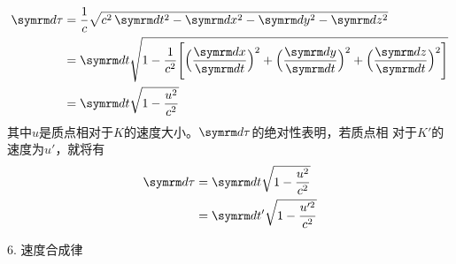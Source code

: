 ~\vspace{-1.56em}
{\setlength{\mathindent}{4em}
\begin{equation}\label{eqn:11.05.07}
    \begin{aligned}
         \dif \tau &=\frac{1}{c} \sqrt{c^{2}  \dif t^{2}- \dif x^{2}- \dif y^{2}- \dif z^{2}} \\
        &= \dif t \sqrt{1-\frac{1}{c^{2}}\Bigg[\Big(\frac{ \dif x}{ \dif t}\Big)^{2}+\Big(\frac{ \dif y}{ \dif t}\Big)^{2}+\Big(\frac{ \dif z}{ \dif t}\Big)^{2}\Bigg]} \\
        &= \dif t \sqrt{1-\frac{u^{2}}{c^{2}}}
    \end{aligned}
\end{equation}}
其中$ u $是质点相对于$ K $的速度大小。$ \dif \tau $的绝对性表明，若质点相
对于$ K ' $的速度为$ u ' $，就将有
\begin{equation*}
    \begin{aligned}
         \dif \tau &= \dif t \sqrt{1-\frac{u^{2}}{c^{2}}} \\
        &= \dif t^{\prime} \sqrt{1-\frac{u^{\prime 2}}{c^{2}}}
    \end{aligned}
\end{equation*}

\textsf{6. 速度合成律}

